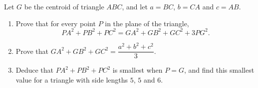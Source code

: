 Let $G$ be the centroid of triangle $ABC$, and let $a=BC$, $b=CA$ and $c=AB$.
\begin{enumerate}
\item[(a)] Prove that for every point $P$ in the plane of the triangle,
\[PA^2+PB^2+PC^2=GA^2+GB^2+GC^2+3PG^2 .\]
\item[(b)] Prove that $GA^2+GB^2+GC^2=\dfrac{a^2+b^2+c^2}{3}$.
\item[(c)] Deduce that $PA^2+PB^2+PC^2$ is smallest when $P=G$, and find this smallest value for a triangle with side lengths $5$, $5$ and $6$.
\end{enumerate}
